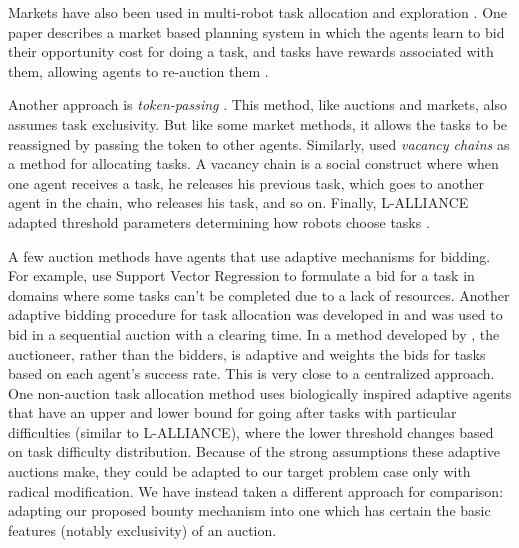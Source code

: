 \documentclass[letterpaper]{aamas2015}
\newcommand\citenauthor[1]{\citen{#1}}
\newcommand\citen[1]{\hbox{\cite{#1}}}
\begin{document}
Markets have also been used in multi-robot task allocation \citen{Botelho:1999,Pustowka:2012} and exploration \citen{Simmons:2000,Zlot:2002}.   One paper describes a market based planning system in which the agents learn to bid their opportunity cost for doing a task, and tasks have rewards associated with them, allowing agents to re-auction them \citenauthor{Schneider:2005}.

Another approach is {\it token-passing} \citen{Farinelli:2005}.  This method, like auctions and markets, also assumes task exclusivity.  But like some market methods, it allows the tasks to be reassigned by passing the token to other agents.  Similarly,  \citenauthor{Dahl2003} used {\it vacancy chains} as a method for allocating tasks.  A vacancy chain is a social construct where when one agent receives a task, he releases his previous task, which goes to another agent in the chain, who releases his task, and so on.  Finally, L-ALLIANCE adapted threshold parameters determining how robots choose tasks \citen{Parker1995,Parker1998}.  


A few auction methods have agents that use adaptive mechanisms for bidding.  For example, \cite{Jones:2007} use Support Vector Regression to formulate a bid for a task in domains where some tasks can't be completed due to a lack of resources.  Another adaptive bidding procedure for task allocation was developed in \cite{Choi:2013} and was used to bid in a sequential auction with a clearing time.  In a method developed by \cite{Pippin:2013}, the auctioneer, rather than the bidders, is adaptive and weights the bids for tasks based on each agent's success rate.  This is very close to a centralized approach.  One non-auction task allocation method \cite{Campbell:2008} uses biologically inspired adaptive agents that have an upper and lower bound for going after tasks with particular difficulties (similar to L-ALLIANCE), where the lower threshold changes based on task difficulty distribution. Because of the strong assumptions these adaptive auctions make, they could be adapted to our target problem case only with radical modification.  We have instead taken a different approach for comparison: adapting our proposed bounty mechanism into one which has certain the basic features (notably exclusivity) of an auction.  
\end{document}
